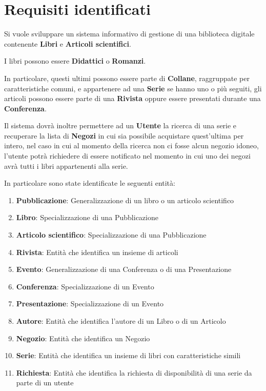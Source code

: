 \chapter{Requisiti identificati}
Si vuole sviluppare un sistema informativo di gestione di una biblioteca digitale contenente \textbf{Libri} e
\textbf{Articoli scientifici}.

I libri possono essere \textbf{Didattici} o \textbf{Romanzi}.

In particolare, questi ultimi possono essere parte di \textbf{Collane}, raggruppate per caratteristiche
comuni, e appartenere ad una \textbf{Serie} se hanno uno o più seguiti, gli articoli possono essere parte
di una \textbf{Rivista} oppure essere presentati durante una \textbf{Conferenza}.

Il sistema dovrà inoltre permettere ad un \textbf{Utente} la ricerca di una serie
e recuperare la lista di \textbf{Negozi} in cui sia possibile acquistare quest'ultima per intero,
nel caso in cui al momento della ricerca non ci fosse alcun negozio idoneo, l'utente potrà richiedere
di essere notificato nel momento in cui uno dei negozi avrà tutti i libri appartenenti alla serie.

In particolare sono state identificate le seguenti entità:
\begin{enumerate}
    \item \textbf{Pubblicazione}: Generalizzazione di un libro o un articolo scientifico
    \item \textbf{Libro}: Specializzazione di una Pubblicazione
    \item \textbf{Articolo scientifico}: Specializzazione di una Pubblicazione
    \item \textbf{Rivista}: Entità che identifica un insieme di articoli
    \item \textbf{Evento}: Generalizzazione di una Conferenza o di una Presentazione
    \item \textbf{Conferenza}: Specializzazione di un Evento
    \item \textbf{Presentazione}: Specializzazione di un Evento
    \item \textbf{Autore}: Entità che identifica l'autore di un Libro o di un Articolo
    \item \textbf{Negozio}: Entità che identifica un Negozio
    \item \textbf{Serie}: Entità che identifica un insieme di libri con caratteristiche simili
    \item \textbf{Richiesta}: Entità che identifica la richiesta di disponibilità di una serie da 
    parte di un utente
\end{enumerate}